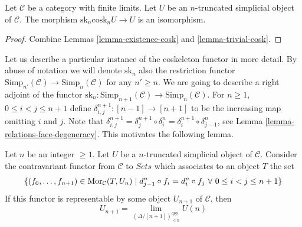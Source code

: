 \begin{lemma}
\label{lemma-recover-cosk}
Let $\mathcal{C}$ be a category with finite limits.
Let $U$ be an $n$-truncated simplicial object of $\mathcal{C}$.
The morphism $\text{sk}_n \text{cosk}_n U \to U$
is an isomorphism.
\end{lemma}

\begin{proof}
Combine Lemmas \ref{lemma-existence-cosk} and \ref{lemma-trivial-cosk}.
\end{proof}

\noindent
Let us describe a particular instance of the coskeleton functor in more detail.
By abuse of notation we will denote $\text{sk}_n$
also the restriction functor
$\text{Simp}_{n'}(\mathcal{C}) \to \text{Simp}_n(\mathcal{C})$
for any $n' \geq n$. We are going to describe a right adjoint
of the functor
$\text{sk}_n : \text{Simp}_{n + 1}(\mathcal{C})
\to \text{Simp}_n(\mathcal{C})$.
For $n \geq 1$, $0 \leq i < j \leq n + 1$
define $\delta^{n + 1}_{i, j} : [n - 1] \to [n + 1]$
to be the increasing map omitting $i$ and $j$.
Note that
$\delta^{n + 1}_{i, j} =
\delta^{n + 1}_j \circ \delta^n_i =
\delta^{n + 1}_i \circ \delta^n_{j - 1}$, see
Lemma \ref{lemma-relations-face-degeneracy}. This motivates
the following lemma.

\begin{lemma}
\label{lemma-formula-limit}
Let $n$ be an integer $\geq 1$.
Let $U$ be a $n$-truncated simplicial object of $\mathcal{C}$.
Consider the contravariant functor from $\mathcal{C}$ to
$\textit{Sets}$ which associates to an object $T$ the set
$$
\{ (f_0, \ldots, f_{n + 1}) \in \mathop{\mathrm{Mor}}\nolimits_\mathcal{C}(T, U_n)
\mid
d^n_{j - 1} \circ f_i = d^n_i \circ f_j
\ \forall\ 0\leq i < j\leq n + 1\}
$$
If this functor is representable by some object $U_{n + 1}$
of $\mathcal{C}$, then
$$
U_{n + 1} = \lim_{(\Delta/[n + 1])_{\leq n}^{opp}} U(n)
$$
\end{lemma}

